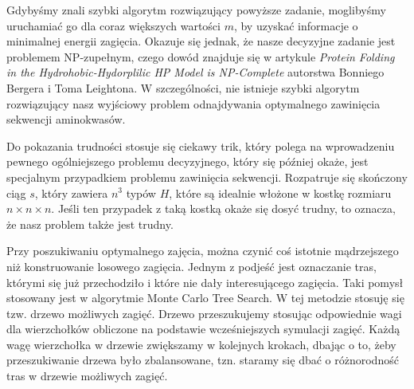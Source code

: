 \documentclass[leqno,10pt]{article}
\begin{document}
Gdybyśmy znali szybki algorytm rozwiązujący powyższe zadanie, moglibyśmy
uruchamiać go dla coraz większych wartości $m$, by uzyskać informacje o
minimalnej energii zagięcia. Okazuje się jednak, że nasze decyzyjne zadanie jest
problemem NP-zupełnym, czego dowód znajduje się w artykule \textit{Protein Folding in the Hydrohobic-Hydorplilic HP Model is
NP-Complete} autorstwa Bonniego Bergera i Toma Leightona. 
W szczególności, nie istnieje szybki algorytm rozwiązujący nasz wyjściowy
problem odnajdywania optymalnego zawinięcia sekwencji aminokwasów. 

Do pokazania trudności stosuje się ciekawy trik, który polega na wprowadzeniu
pewnego ogólniejszego problemu decyzyjnego, który się później okaże, jest
specjalnym przypadkiem problemu zawinięcia sekwencji. Rozpatruje się skończony ciąg $s$, który zawiera $n^{3}$ typów $H$, które są idealnie włożone w kostkę rozmiaru $n \times n \times n$. Jeśli ten przypadek z taką kostką okaże
się dosyć trudny, to oznacza, że nasz problem także jest trudny. 

Przy poszukiwaniu optymalnego zajęcia, można czynić coś istotnie mądrzejszego niż konstruowanie losowego zagięcia. Jednym z podjeść jest oznaczanie tras, którymi się już przechodziło i które nie dały interesującego zagięcia. Taki pomysł stosowany jest w algorytmie Monte Carlo Tree Search. W tej metodzie stosuję się tzw. drzewo możliwych zagięć. Drzewo przeszukujemy stosując odpowiednie wagi dla wierzchołków obliczone na podstawie wcześniejszych symulacji zagięć. Każdą wagę wierzchołka w drzewie zwiększamy w kolejnych krokach, dbając o to, żeby przeszukiwanie drzewa było zbalansowane, tzn. staramy się dbać o różnorodność tras w drzewie możliwych zagięć. 
\end{document}
